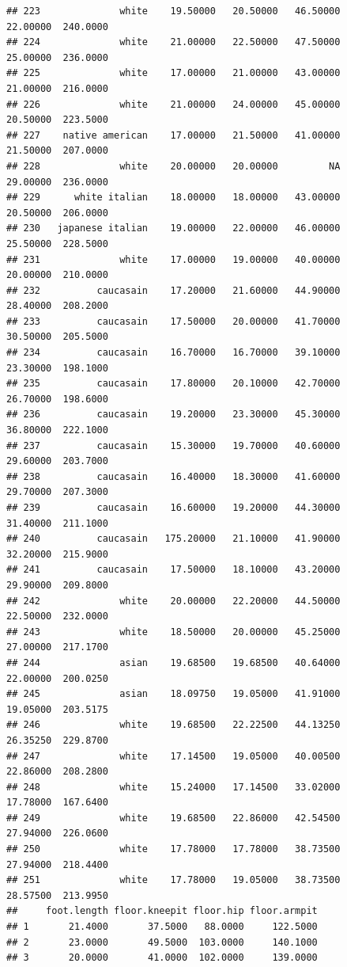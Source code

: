 \documentclass[]{article}
\begin{document}
\begin{verbatim}
## 223              white    19.50000   20.50000   46.50000     22.00000  240.0000
## 224              white    21.00000   22.50000   47.50000     25.00000  236.0000
## 225              white    17.00000   21.00000   43.00000     21.00000  216.0000
## 226              white    21.00000   24.00000   45.00000     20.50000  223.5000
## 227    native american    17.00000   21.50000   41.00000     21.50000  207.0000
## 228              white    20.00000   20.00000         NA     29.00000  236.0000
## 229      white italian    18.00000   18.00000   43.00000     20.50000  206.0000
## 230   japanese italian    19.00000   22.00000   46.00000     25.50000  228.5000
## 231              white    17.00000   19.00000   40.00000     20.00000  210.0000
## 232          caucasain    17.20000   21.60000   44.90000     28.40000  208.2000
## 233          caucasain    17.50000   20.00000   41.70000     30.50000  205.5000
## 234          caucasain    16.70000   16.70000   39.10000     23.30000  198.1000
## 235          caucasain    17.80000   20.10000   42.70000     26.70000  198.6000
## 236          caucasain    19.20000   23.30000   45.30000     36.80000  222.1000
## 237          caucasain    15.30000   19.70000   40.60000     29.60000  203.7000
## 238          caucasain    16.40000   18.30000   41.60000     29.70000  207.3000
## 239          caucasain    16.60000   19.20000   44.30000     31.40000  211.1000
## 240          caucasain   175.20000   21.10000   41.90000     32.20000  215.9000
## 241          caucasain    17.50000   18.10000   43.20000     29.90000  209.8000
## 242              white    20.00000   22.20000   44.50000     22.50000  232.0000
## 243              white    18.50000   20.00000   45.25000     27.00000  217.1700
## 244              asian    19.68500   19.68500   40.64000     22.00000  200.0250
## 245              asian    18.09750   19.05000   41.91000     19.05000  203.5175
## 246              white    19.68500   22.22500   44.13250     26.35250  229.8700
## 247              white    17.14500   19.05000   40.00500     22.86000  208.2800
## 248              white    15.24000   17.14500   33.02000     17.78000  167.6400
## 249              white    19.68500   22.86000   42.54500     27.94000  226.0600
## 250              white    17.78000   17.78000   38.73500     27.94000  218.4400
## 251              white    17.78000   19.05000   38.73500     28.57500  213.9950
##     foot.length floor.kneepit floor.hip floor.armpit
## 1       21.4000       37.5000   88.0000     122.5000
## 2       23.0000       49.5000  103.0000     140.1000
## 3       20.0000       41.0000  102.0000     139.0000

\end{verbatim}
\end{document}
